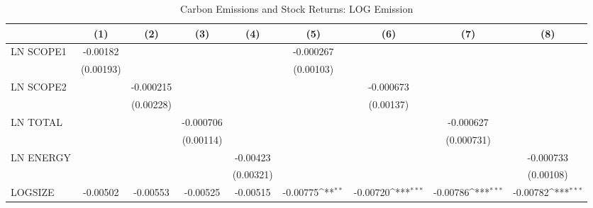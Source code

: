\begin{table}[htbp]\centering
\def\sym#1{\ifmmode^{#1}\else\(^{#1}\)\fi}
\caption{Carbon Emissions and Stock Returns: LOG Emission}
\begin{tabular}{l*{8}{c}}
\hline\hline
                    &\multicolumn{1}{c}{(1)}         &\multicolumn{1}{c}{(2)}         &\multicolumn{1}{c}{(3)}         &\multicolumn{1}{c}{(4)}         &\multicolumn{1}{c}{(5)}         &\multicolumn{1}{c}{(6)}         &\multicolumn{1}{c}{(7)}         &\multicolumn{1}{c}{(8)}         \\
\hline
LN SCOPE1           &    -0.00182         &                     &                     &                     &   -0.000267         &                     &                     &                     \\
                    &   (0.00193)         &                     &                     &                     &   (0.00103)         &                     &                     &                     \\
LN SCOPE2           &                     &   -0.000215         &                     &                     &                     &   -0.000673         &                     &                     \\
                    &                     &   (0.00228)         &                     &                     &                     &   (0.00137)         &                     &                     \\
LN TOTAL            &                     &                     &   -0.000706         &                     &                     &                     &   -0.000627         &                     \\
                    &                     &                     &   (0.00114)         &                     &                     &                     &  (0.000731)         &                     \\
LN ENERGY           &                     &                     &                     &    -0.00423         &                     &                     &                     &   -0.000733         \\
                    &                     &                     &                     &   (0.00321)         &                     &                     &                     &   (0.00108)         \\
LOGSIZE             &    -0.00502         &    -0.00553         &    -0.00525         &    -0.00515         &    -0.00775\sym{**} &    -0.00720\sym{***}&    -0.00786\sym{***}&    -0.00782\sym{***}\\

\end{tabular}
\end{table}
